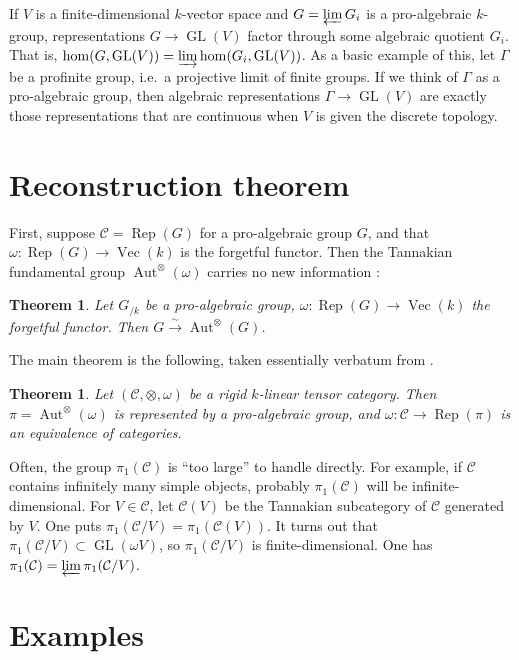 \documentclass{article}
\DeclareMathOperator{\aut}{Aut}
\DeclareMathOperator{\GL}{GL}
\DeclareMathOperator{\rep}{Rep}
\DeclareMathOperator{\vect}{Vec}
\newcommand{\cC}{\mathcal{C}}
\newcommand{\iso}{\xrightarrow\sim}
\newtheorem{theorem}[subsection]{Theorem}
\begin{document}
If $V$ is a finite-dimensional $k$-vector space and $G=\varprojlim G_i$ is a 
pro-algebraic $k$-group, representations $G\to \GL(V)$ factor through some 
algebraic quotient $G_i$. That is, 
$\hom(G,\GL(V))=\varinjlim \hom(G_i,\GL(V))$. As a basic example of this, 
let $\Gamma$ be a profinite group, i.e.~a projective limit of finite groups. If 
we think of $\Gamma$ as a pro-algebraic group, then algebraic representations 
$\Gamma\to \GL(V)$ are exactly those representations that are continuous when 
$V$ is given the discrete topology. 





\section{Reconstruction theorem}

First, suppose $\cC=\rep(G)$ for a pro-algebraic group $G$, and that 
$\omega:\rep(G)\to \vect(k)$ is the forgetful functor. Then the Tannakian 
fundamental group $\aut^\otimes(\omega)$ carries no new information 
\cite[Pr.~2.8]{deligne-milne-1982}: 

\begin{theorem}\label{thm:reconst}
Let $G_{/k}$ be a pro-algebraic group, $\omega:\rep(G)\to \vect(k)$ the 
forgetful functor. Then $G\iso \aut^\otimes(G)$. 
\end{theorem}

The main theorem is the following, taken essentially verbatum from 
\cite[Th.~2.11]{deligne-milne-1982}. 

\begin{theorem}\label{thm:main}
Let $(\cC,\otimes,\omega)$ be a rigid $k$-linear tensor category. Then 
$\pi=\aut^\otimes(\omega)$ is represented by a pro-algebraic group, and 
$\omega:\cC\to \rep(\pi)$ is an equivalence of categories. 
\end{theorem}

Often, the group $\pi_1(\cC)$ is ``too large'' to handle directly. For 
example, if $\cC$ contains infinitely many simple objects, probably 
$\pi_1(\cC)$ will be infinite-dimensional. For $V\in \cC$, let 
$\cC(V)$ be the Tannakian subcategory of $\cC$ generated by $V$. One 
puts $\pi_1(\cC/V)=\pi_1(\cC(V))$. It turns out that 
$\pi_1(\cC/V)\subset \GL(\omega V)$, so $\pi_1(\cC/V)$ is finite-dimensional. 
One has $\pi_1(\cC)=\varprojlim \pi_1(\cC/V)$. 





\section{Examples}
\end{document}
